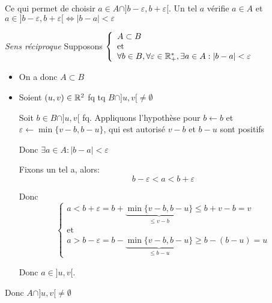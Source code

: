 \documentclass{article}
\begin{document}
\begin{question_kholle}
\begin{itemize}[label=\textemdash]
				      Ce qui permet de choisir $a \in A \cap ]b - \varepsilon,  b + \varepsilon[$.
				      Un tel $a$ vérifie $a \in A$ et $a \in ]b - \varepsilon,  b + \varepsilon[ \iff |b-a| < \varepsilon$
	\end{itemize}
	\bigbreak
	\noindent \emph{Sens réciproque} Supposons $\left\{\begin{array}{ll} A \subset B \\\mathrm{et}\\ \forall b \in B, \forall \varepsilon \in \mathbb R_+^*, \exists a \in A: |b-a|< \varepsilon \end{array}\right.$

	\begin{itemize}
		\item On a donc $A \subset B$
		\item Soient $(u, v) \in \mathbb R^2$ fq tq $B \cap ]u, v[ \neq \emptyset$

						      Soit $b \in B \cap ]u, v[$ fq.
						      Appliquons l'hypothèse pour $b\leftarrow b$ et $\varepsilon \leftarrow \min\{v - b, b - u\}$, qui est autorisé $v-b$ et $b-u$ sont positifs

						      Donc $\exists a \in A: | b - a| < \varepsilon $

						      Fixons un tel a, alors:
						      $$
							      b-\varepsilon < a < b + \varepsilon
						      $$

						      Donc $$
							      \left\{\begin{array}{ll}
								      a < b + \varepsilon = b + \underbrace{\min\{v - b, b - u\}}_{\leqslant v - b} \leqslant b + v - b = v \\ \mathrm{et}\\
								      a > b - \varepsilon = b - \underbrace{\min\{v - b, b - u\}}_{\leqslant b - u} \geqslant b - (b - u) = u
							      \end{array}\right.
						      $$

						      Donc $a \in ]u, v[$.
	\end{itemize}
	Donc $A \cap ]u, v[ \neq \emptyset$

\end{question_kholle}
\end{document}
